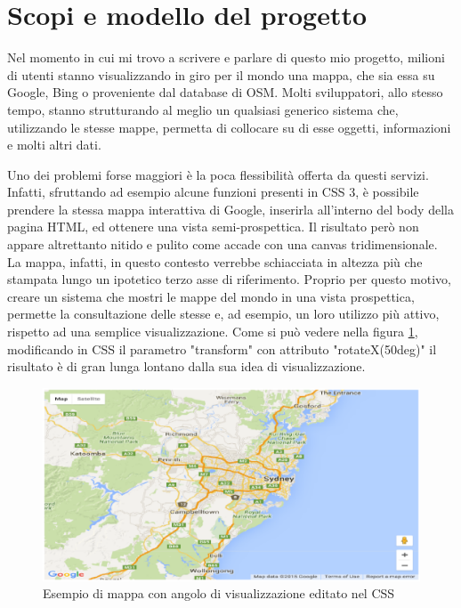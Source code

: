 \section{Scopi e modello del progetto}
Nel momento in cui mi trovo a scrivere e parlare di questo mio progetto, milioni di utenti stanno visualizzando in giro per il mondo una mappa, che sia essa su Google, Bing o proveniente dal database di OSM. Molti sviluppatori, allo stesso tempo, stanno strutturando al meglio un qualsiasi generico sistema che, utilizzando le stesse mappe, permetta di collocare su di esse oggetti, informazioni e molti altri dati.

Uno dei problemi forse maggiori è la poca flessibilità offerta da questi servizi. Infatti, sfruttando ad esempio alcune funzioni presenti in CSS 3, è possibile prendere la stessa mappa interattiva di Google, inserirla all'interno del body della pagina HTML, ed ottenere una vista semi-prospettica. Il risultato però non appare altrettanto nitido e pulito come accade con una canvas tridimensionale. La mappa, infatti, in questo contesto verrebbe schiacciata in altezza più che stampata lungo un ipotetico terzo asse di riferimento. Proprio per questo motivo, creare un sistema che mostri le mappe del mondo in una vista prospettica, permette la consultazione delle stesse e, ad esempio, un loro utilizzo più attivo, rispetto ad una semplice visualizzazione. Come si può vedere nella figura \ref{fig:rotationcss}, modificando in CSS il parametro "transform" con attributo "rotateX(50deg)" il risultato è di gran lunga lontano dalla sua idea di visualizzazione.

\begin{figure}[H]
	\centering
	\includegraphics[scale=0.5]{figure/rotationcss.eps}
	\caption{Esempio di mappa con angolo di visualizzazione editato nel CSS}\label{fig:rotationcss}
\end{figure}

